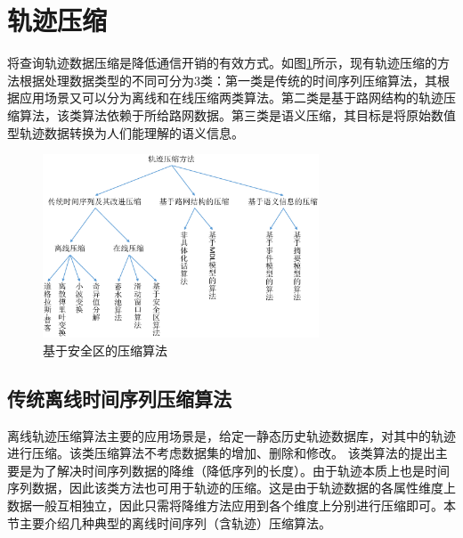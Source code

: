 \section{轨迹压缩}\label{sec-c2-reduction}
将查询轨迹数据压缩是降低通信开销的有效方式。如图\ref{fig-chapter2-compress}所示，现有轨迹压缩的方法根据处理数据类型的不同可分为3类\cite{jiang}：第一类是传统的时间序列压缩算法，其根据应用场景又可以分为离线和在线压缩两类算法。第二类是基于路网结构的轨迹压缩算法，该类算法依赖于所给路网数据。第三类是语义压缩，其目标是将原始数值型轨迹数据转换为人们能理解的语义信息。
\begin{figure}[t]
	\centering
	\includegraphics[width=0.73\textwidth]{Fig/chapter2/Compress}
	\caption{基于安全区的压缩算法}
	\label{fig-chapter2-compress}
\end{figure}

\subsection{传统离线时间序列压缩算法}
离线轨迹压缩算法主要的应用场景是，给定一静态历史轨迹数据库，对其中的轨迹进行压缩。该类压缩算法不考虑数据集的增加、删除和修改。
该类算法的提出主要是为了解决时间序列数据的降维（降低序列的长度）。由于轨迹本质上也是时间序列数据，因此该类方法也可用于轨迹的压缩。这是由于轨迹数据的各属性维度上数据一般互相独立，因此只需将降维方法应用到各个维度上分别进行压缩即可。本节主要介绍几种典型的离线时间序列（含轨迹）压缩算法。




